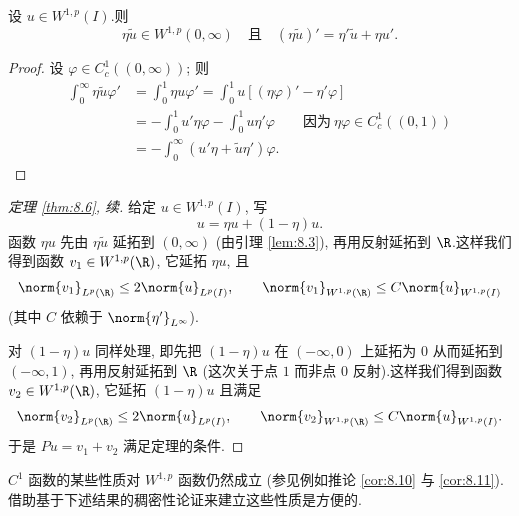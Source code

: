 \begin{lemma}
\label{lem:8.3}
设 $u\in W^{1,p}(I)$.则
\begin{equation*}
\eta\tilde u\in W^{1,p}(0,\infty)
\quad\text{且}\quad
(\eta\tilde u)'=\eta'\tilde u+\eta u'.
\end{equation*}
\end{lemma}

\begin{proof}
设 $\varphi\in C_c^1((0,\infty))$; 则
\begin{equation*}
\begin{aligned}
\int_0^\infty\eta\tilde u\varphi'
&=\int_0^1\eta u\varphi'=\int_0^1u[(\eta\varphi)'-\eta'\varphi]\\
&=-\int_0^1u'\eta\varphi-\int_0^1u\eta'\varphi
\qquad\text{因为}\ \eta\varphi\in C_c^1((0,1))\\
&=-\int_0^\infty(u'\eta+\tilde u\eta')\varphi.
\end{aligned}
\end{equation*}
\end{proof}

\begin{proof}[定理 \ref{thm:8.6}, 续]
给定 $u\in W^{1,p}(I)$, 写
\begin{equation*}
u=\eta u+(1-\eta)u.
\end{equation*}
函数 $\eta u$ 先由 $\eta\tilde u$ 延拓到 $(0,\infty)$ (由引理  \ref{lem:8.3}),
再用反射延拓到 $\R$.这样我们得到函数 $v_1\in W^{1,p}(\R)$, 它延拓 $\eta u$,
且
\begin{equation*}
\norm{v_1}_{L^p(\R)}\le2\norm{u}_{L^p(I)},\qquad
\norm{v_1}_{W^{1,p}(\R)}\le C\norm{u}_{W^{1,p}(I)}
\end{equation*}
(其中 $C$ 依赖于 $\norm{\eta'}_{L^\infty}$).

对 $(1-\eta)u$ 同样处理, 即先把 $(1-\eta)u$ 在 $(-\infty,0)$ 上延拓为 $0$
从而延拓到 $(-\infty,1)$, 再用反射延拓到 $\R$ (这次关于点 $1$ 而非点 $0$
反射).这样我们得到函数 $v_2\in W^{1,p}(\R)$, 它延拓 $(1-\eta)u$ 且满足
\begin{equation*}
\norm{v_2}_{L^p(\R)}\le2\norm{u}_{L^p(I)},\qquad
\norm{v_2}_{W^{1,p}(\R)}\le C\norm{u}_{W^{1,p}(I)}.
\end{equation*}
于是 $Pu=v_1+v_2$ 满足定理的条件.
\end{proof}

$C^1$ 函数的某些性质对 $W^{1,p}$ 函数仍然成立 (参见例如推论  \ref{cor:8.10} 与
 \ref{cor:8.11}).借助基于下述结果的稠密性论证来建立这些性质是方便的.

